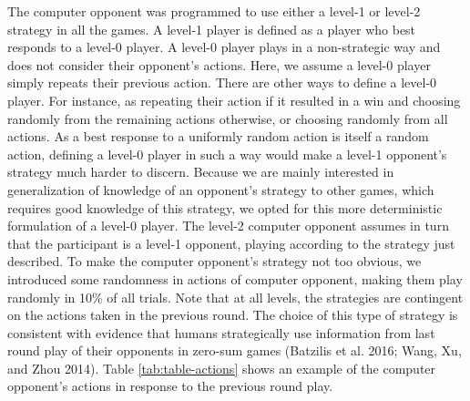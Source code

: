 \documentclass[smallextended]{svjour3}       %
\begin{document}
The computer opponent was programmed to use either a level-1 or level-2
strategy in all the games. A level-1 player is defined as a player who
best responds to a level-0 player. A level-0 player plays in a
non-strategic way and does not consider their opponent's actions. Here,
we assume a level-0 player simply repeats their previous action. There
are other ways to define a level-0 player. For instance, as repeating
their action if it resulted in a win and choosing randomly from the
remaining actions otherwise, or choosing randomly from all actions. As a
best response to a uniformly random action is itself a random action,
defining a level-0 player in such a way would make a level-1 opponent's
strategy much harder to discern. Because we are mainly interested in
generalization of knowledge of an opponent's strategy to other games,
which requires good knowledge of this strategy, we opted for this more
deterministic formulation of a level-0 player. The level-2 computer
opponent assumes in turn that the participant is a level-1 opponent,
playing according to the strategy just described. To make the computer
opponent's strategy not too obvious, we introduced some randomness in
actions of computer opponent, making them play randomly in 10\% of all
trials. Note that at all levels, the strategies are contingent on the
actions taken in the previous round. The choice of this type of strategy
is consistent with evidence that humans strategically use information
from last round play of their opponents in zero-sum games (Batzilis et
al. 2016; Wang, Xu, and Zhou 2014). Table \ref{tab:table-actions} shows
an example of the computer opponent's actions in response to the
previous round play.

\begin{table}

\caption{\label{tab:table-actions}Example of how a level-1 and level-2 computer agent plays in response to actions taken in the previous round}
\centering
{}
\end{table}
\end{document}
